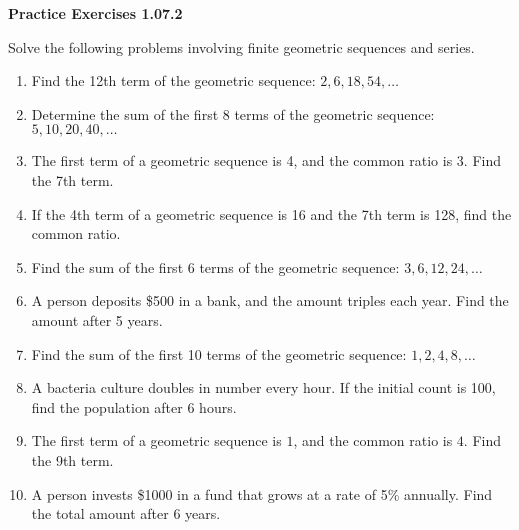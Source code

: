\vspace{0.3ex}
\noindent\textbf{Practice Exercises 1.07.2}

\vspace{0.2ex}

Solve the following problems involving finite geometric sequences and series.
\begin{enumerate}
    \item Find the 12th term of the geometric sequence: \(2, 6, 18, 54, \dots\)
    \item Determine the sum of the first 8 terms of the geometric sequence: \(5, 10, 20, 40, \dots\)
    \item The first term of a geometric sequence is 4, and the common ratio is 3. Find the 7th term.
    \item If the 4th term of a geometric sequence is 16 and the 7th term is 128, find the common ratio.
    \item Find the sum of the first 6 terms of the geometric sequence: \(3, 6, 12, 24, \dots\)
    \item A person deposits \$500 in a bank, and the amount triples each year. Find the amount after 5 years.
    \item Find the sum of the first 10 terms of the geometric sequence: \(1, 2, 4, 8, \dots\)
    \item A bacteria culture doubles in number every hour. If the initial count is 100, find the population after 6 hours.
    \item The first term of a geometric sequence is \(1\), and the common ratio is \(4\). Find the 9th term.
    \item A person invests \$1000 in a fund that grows at a rate of 5\% annually. Find the total amount after 6 years.
\end{enumerate}
